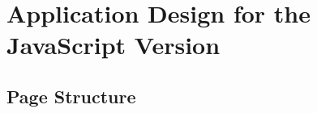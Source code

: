 \documentclass[12pt, a4paper, renqo, final]{amsart}
\let\stdsection\section
\renewcommand{\section}{\newpage\stdsection}
\begin{document}
		\section[RIA - Application Design]{Application Design for the JavaScript Version}
			\subsection{Page Structure}
				\noindent {}
				\phantom{.}\\
				\noindent {}
				\newpage
\end{document}
